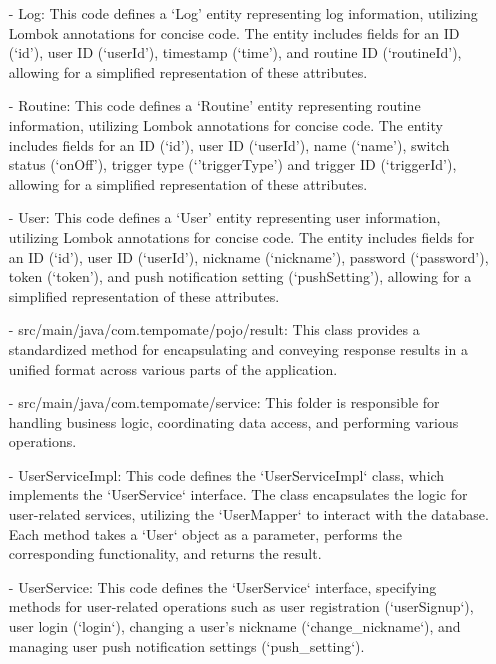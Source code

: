 \begin{enumerate}
    \item[-] Log: This code defines a ‘Log' entity representing log information, utilizing Lombok annotations for concise code. The entity includes fields for an ID (‘id’), user ID (‘userId’), timestamp (‘time’), and routine ID (‘routineId’), allowing for a simplified representation of these attributes. \\
    \item[-] Routine: This code defines a ‘Routine' entity representing routine information, utilizing Lombok annotations for concise code. The entity includes fields for an ID (‘id’), user ID (‘userId’), name (‘name’), switch status (‘onOff’), trigger type (‘’triggerType’) and trigger ID (‘triggerId’), allowing for a simplified representation of these attributes.\\
    \item[-] User: This code defines a ‘User' entity representing user information, utilizing Lombok annotations for concise code. The entity includes fields for an ID (‘id’), user ID (‘userId’), nickname (‘nickname’), password (‘password’), token (‘token’), and push notification setting (‘pushSetting’), allowing for a simplified representation of these attributes.\\
    \item[-] src/main/java/com.tempomate/pojo/result: This class provides a standardized method for encapsulating and conveying response results in a unified format across various parts of the application.\\
    \item[-] src/main/java/com.tempomate/service: This folder is responsible for handling business logic, coordinating data access, and performing various operations.\\
    \item[-] UserServiceImpl: This code defines the `UserServiceImpl` class, which implements the `UserService` interface. The class encapsulates the logic for user-related services, utilizing the `UserMapper` to interact with the database. Each method takes a `User` object as a parameter, performs the corresponding functionality, and returns the result.\\
    \item[-] UserService: This code defines the `UserService` interface, specifying methods for user-related operations such as user registration (`userSignup`), user login (`login`), changing a user's nickname (`change\_nickname`), and managing user push notification settings (`push\_setting`).\\
\end{enumerate}
